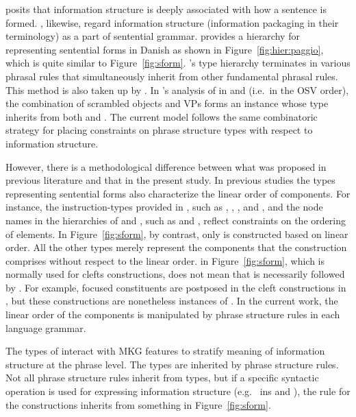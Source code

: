 \citet{lambrecht:96} posits that information structure is deeply
associated with how a sentence is formed. \citet{engdahl:vallduvi:96},
likewise, regard information structure (information packaging in their
terminology) as a part of sentential grammar. \citet{paggio:09}
provides a hierarchy for representing sentential forms in Danish as
shown in Figure~\ref{fig:hier:paggio}, which is
quite similar to Figure~\ref{fig:sform}. \citeauthor{paggio:09}'s type
hierarchy terminates in various phrasal rules that simultaneously
inherit from other fundamental phrasal rules. This method is also
taken up by \citet{song:bender:11}.  In \citeauthor{song:bender:11}'s
analysis of  in  and 
(i.e.\ in the OSV order), the combination of scrambled objects and VPs
forms an instance whose type inherits from both 
and . The current model follows the same
combinatoric strategy for placing constraints on phrase structure
types with respect to information structure.


However, there is a methodological difference between what was
proposed in previous literature and that in the present study. In
previous studies the types representing sentential forms also
characterize the linear order of components. For instance, the
instruction-types provided in \citet{engdahl:vallduvi:96}, such as
, , , and
, and the node names in the hierarchies of
\citet{paggio:09} and \citet{song:bender:11}, such as
 and , reflect constraints on the
ordering of elements.  In Figure~\ref{fig:sform},
by contrast, only  is constructed based on linear
order. All the other types merely represent the components that the
construction comprises without respect to the linear
order.  in Figure~\ref{fig:sform}, which is normally
used for clefts constructions, does not mean that
 is necessarily followed by .  For example, focused
constituents are postposed in the cleft constructions in 
\citep{kim:yang:09}, but these constructions are nonetheless instances
of .  In the current work, the linear order of the
components is manipulated by phrase structure rules in each language
grammar.




The types of  interact with MKG features to stratify
meaning of information structure at the phrase
level. The  types are inherited by
phrase structure rules. Not all phrase structure rules inherit from
 types, but if a specific syntactic operation is used for
expressing information structure (e.g.\  ins
 and ), the rule for the constructions
inherits from something in Figure~\ref{fig:sform}.



